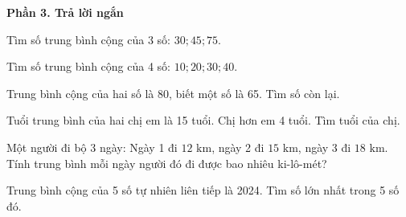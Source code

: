 \textbf{Phần 3. Trả lời ngắn}

\begin{ex} %
Tìm số trung bình cộng của 3 số: $30; 45; 75$.
\end{ex}

\begin{ex} %
Tìm số trung bình cộng của 4 số: $10; 20; 30; 40$.
\end{ex}

\begin{ex} %
Trung bình cộng của hai số là 80, biết một số là 65. Tìm số còn lại.
\end{ex}

\begin{ex} %
Tuổi trung bình của hai chị em là 15 tuổi. Chị hơn em 4 tuổi. Tìm tuổi của chị.
\end{ex}

\begin{ex} %
Một người đi bộ 3 ngày: Ngày 1 đi $12\text{ km}$, ngày 2 đi $15\text{ km}$, ngày 3 đi $18\text{ km}$. Tính trung bình mỗi ngày người đó đi được bao nhiêu ki-lô-mét?
\end{ex}

\begin{ex} %
Trung bình cộng của 5 số tự nhiên liên tiếp là 2024. Tìm số lớn nhất trong 5 số đó.
\end{ex}

